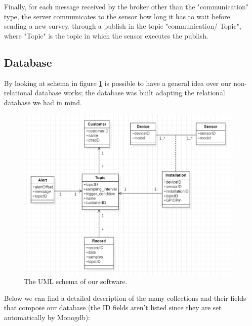 Finally, for each message received by the broker other than the "communication" type, the server communicates to the sensor how long it has to wait before sending a new survey, through a publish in the topic "communication/ Topic", where "Topic" is the topic in which the sensor executes the publish.

\subsection{Database}
By looking at schema in figure \ref{fig:dbcollections} is possible to have a general idea over our non-relational database works; the database was built adapting the relational database we had in mind.
\begin{figure}[H]%
    \centering
    \includegraphics[width=0.9\linewidth]{images/collections.png}
    \caption{The UML schema of our software.}
    \label{fig:dbcollections}
\end{figure}
Below we can find a detailed description of the many collections and their fields that compose our database (the ID fields aren't listed since they are set automatically by Monogdb):
